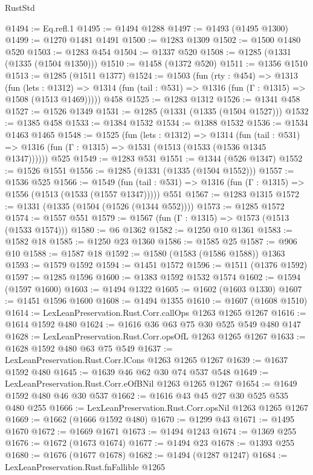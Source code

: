 \begin{lexlean}{RustStd}
\begin{coremodule}
@1494 := Eq.refl.{1}
@1495 := @1494 @1288
@1497 := @1493 (@1495 @1300)
@1499 := @1270 @1481 @1491
@1500 := @1283 @1309
@1502 := @1500 @1480 @520
@1503 := @1283 @454
@1504 := @1337 @520
@1508 := @1285 (@1331 (@1335 (@1504 @1350)))
@1510 := @1458 (@1372 @520)
@1511 := @1356 @1510
@1513 := @1285 (@1511 @1377)
@1524 := @1503
    (fun (rty : @454) =>
    @1313
      (fun (lets : @1312) =>
      @1314 (fun (tail : @531) => @1316 (fun (Γ : @1315) => @1508 (@1513 @1469)))))
    @458
@1525 := @1283 @1312
@1526 := @1341 @458
@1527 := @1526 @1349
@1531 := @1285 (@1331 (@1335 (@1504 @1527)))
@1532 := @1385 @458
@1533 := @1384 @1532
@1534 := @1388 @1532
@1536 := @1534 @1463 @1465
@1548 := @1525
    (fun (lets : @1312) =>
    @1314
      (fun (tail : @531) => @1316 (fun (Γ : @1315) => @1531 (@1513 (@1533 (@1536 @1345 @1347))))))
    @525
@1549 := @1283 @531
@1551 := @1344 (@526 @1347)
@1552 := @1526 @1551
@1556 := @1285 (@1331 (@1335 (@1504 @1552)))
@1557 := @1536 @525
@1566 := @1549
    (fun (tail : @531) => @1316 (fun (Γ : @1315) => @1556 (@1513 (@1533 (@1557 @1347)))))
    @551
@1567 := @1283 @1315
@1572 := @1331 (@1335 (@1504 (@1526 (@1344 @552))))
@1573 := @1285 @1572
@1574 := @1557 @551
@1579 := @1567 (fun (Γ : @1315) => @1573 (@1513 (@1533 @1574)))
@1580 := @6 @1362
@1582 := @1250 @10 @1361
@1583 := @1582 @18
@1585 := @1250 @23 @1360
@1586 := @1585 @25
@1587 := @906 @10
@1588 := @1587 @18
@1592 := @1580 (@1583 (@1586 @1588)) @1363
@1593 := @1579 @1592
@1594 := @1451 @1572
@1596 := @1511 (@1376 @1592)
@1597 := @1285 @1596
@1600 := @1383 @1592 @1532 @1574
@1602 := @1594 (@1597 @1600)
@1603 := @1494 @1322
@1605 := @1602 (@1603 @1330)
@1607 := @1451 @1596 @1600
@1608 := @1494 @1355
@1610 := @1607 (@1608 @1510)
@1614 := LexLeanPreservation.Rust.Corr.callOps @1263 @1265 @1267
@1616 := @1614 @1592 @480
@1624 := @1616 @36 @63 @75 @30 @525 @549 @480 @147
@1628 := LexLeanPreservation.Rust.Corr.opsOfL @1263 @1265 @1267
@1633 := @1628 @1592 @480 @63 @75 @549
@1637 := LexLeanPreservation.Rust.Corr.lCons @1263 @1265 @1267
@1639 := @1637 @1592 @480
@1645 := @1639 @46 @62 @30 @74 @537 @548
@1649 := LexLeanPreservation.Rust.Corr.eOfBNil @1263 @1265 @1267
@1654 := @1649 @1592 @480 @46 @30 @537
@1662 := @1616 @43 @45 @27 @30 @525 @535 @480 @255
@1666 := LexLeanPreservation.Rust.Corr.opsNil @1263 @1265 @1267
@1669 := @1662 (@1666 @1592 @480)
@1670 := @1299 @43
@1671 := @1495 @1670
@1672 := @1669 @1671
@1673 := @1494 @1243
@1674 := @1369 @255
@1676 := @1672 (@1673 @1674)
@1677 := @1494 @23
@1678 := @1393 @255
@1680 := @1676 (@1677 @1678)
@1682 := @1494 (@1287 @1247)
@1684 := LexLeanPreservation.Rust.fnFallible @1265

\end{coremodule}
\end{lexlean}
